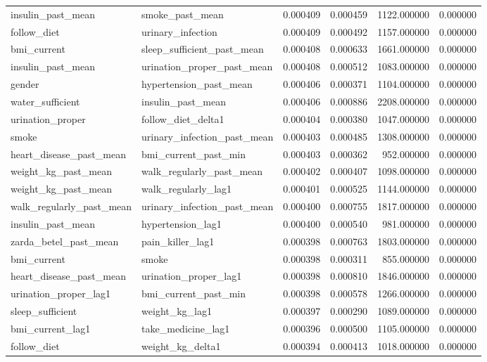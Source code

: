 \begin{longtable}{llrrrr}
insulin\_past\_mean & smoke\_past\_mean & 0.000409 & 0.000459 & 1122.000000 & 0.000000 \\
follow\_diet & urinary\_infection & 0.000409 & 0.000492 & 1157.000000 & 0.000000 \\
bmi\_current & sleep\_sufficient\_past\_mean & 0.000408 & 0.000633 & 1661.000000 & 0.000000 \\
insulin\_past\_mean & urination\_proper\_past\_mean & 0.000408 & 0.000512 & 1083.000000 & 0.000000 \\
gender & hypertension\_past\_mean & 0.000406 & 0.000371 & 1104.000000 & 0.000000 \\
water\_sufficient & insulin\_past\_mean & 0.000406 & 0.000886 & 2208.000000 & 0.000000 \\
urination\_proper & follow\_diet\_delta1 & 0.000404 & 0.000380 & 1047.000000 & 0.000000 \\
smoke & urinary\_infection\_past\_mean & 0.000403 & 0.000485 & 1308.000000 & 0.000000 \\
heart\_disease\_past\_mean & bmi\_current\_past\_min & 0.000403 & 0.000362 & 952.000000 & 0.000000 \\
weight\_kg\_past\_mean & walk\_regularly\_past\_mean & 0.000402 & 0.000407 & 1098.000000 & 0.000000 \\
weight\_kg\_past\_mean & walk\_regularly\_lag1 & 0.000401 & 0.000525 & 1144.000000 & 0.000000 \\
walk\_regularly\_past\_mean & urinary\_infection\_past\_mean & 0.000400 & 0.000755 & 1817.000000 & 0.000000 \\
insulin\_past\_mean & hypertension\_lag1 & 0.000400 & 0.000540 & 981.000000 & 0.000000 \\
zarda\_betel\_past\_mean & pain\_killer\_lag1 & 0.000398 & 0.000763 & 1803.000000 & 0.000000 \\
bmi\_current & smoke & 0.000398 & 0.000311 & 855.000000 & 0.000000 \\
heart\_disease\_past\_mean & urination\_proper\_lag1 & 0.000398 & 0.000810 & 1846.000000 & 0.000000 \\
urination\_proper\_lag1 & bmi\_current\_past\_min & 0.000398 & 0.000578 & 1266.000000 & 0.000000 \\
sleep\_sufficient & weight\_kg\_lag1 & 0.000397 & 0.000290 & 1089.000000 & 0.000000 \\
bmi\_current\_lag1 & take\_medicine\_lag1 & 0.000396 & 0.000500 & 1105.000000 & 0.000000 \\
follow\_diet & weight\_kg\_delta1 & 0.000394 & 0.000413 & 1018.000000 & 0.000000 \\

\end{longtable}
